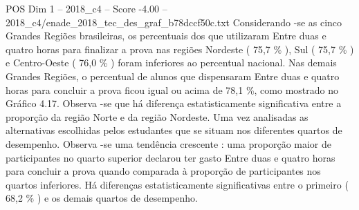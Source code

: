 \begin{textsample}{POS Dim 1 – 2018\_c4 – Score -4.00 – 2018\_c4/enade\_2018\_tec\_des\_graf\_b78dccf50c.txt}
Considerando -se as cinco Grandes Regiões brasileiras, os percentuais dos que utilizaram Entre duas e quatro horas para finalizar a prova nas regiões Nordeste ( 75,7 \% ), Sul ( 75,7 \% ) e Centro-Oeste ( 76,0 \% ) foram inferiores ao percentual nacional.
Nas demais Grandes Regiões, o percentual de alunos que dispensaram Entre duas e quatro horas para concluir a prova ficou igual ou acima de 78,1 \%, como mostrado no Gráfico 4.17.
Observa -se que há diferença estatisticamente significativa entre a proporção da região Norte e da região Nordeste.
Uma vez analisadas as alternativas escolhidas pelos estudantes que se situam nos diferentes quartos de desempenho.
Observa -se uma tendência crescente : uma proporção maior de participantes no quarto superior declarou ter gasto Entre duas e quatro horas para concluir a prova quando comparada à proporção de participantes nos quartos inferiores.
Há diferenças estatisticamente significativas entre o primeiro ( 68,2 \% ) e os demais quartos de desempenho.

\end{textsample}
